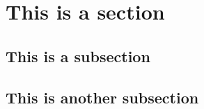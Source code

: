 \documentclass[12pt, a4paper]{article}
\begin{document}
\blindtext
\setcounter{page}{4}
\section{This is a section}
\blindtext
\subsection{This is a subsection}
\blindtext
	
\subsection{This is another subsection}

\blinddocument
\end{document}
